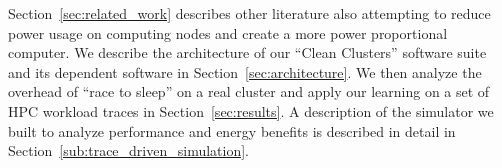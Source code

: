 Section~\ref{sec:related_work} describes other literature also attempting to reduce power usage on computing nodes and create a more power proportional computer. We describe the architecture of our ``Clean Clusters'' software suite and its dependent software in Section~\ref{sec:architecture}. We then analyze the overhead of ``race to sleep'' on a real cluster and apply our learning on a set of HPC workload traces in Section~\ref{sec:results}. A description of the simulator we built to analyze performance and energy benefits is described in detail in Section~\ref{sub:trace_driven_simulation}.



